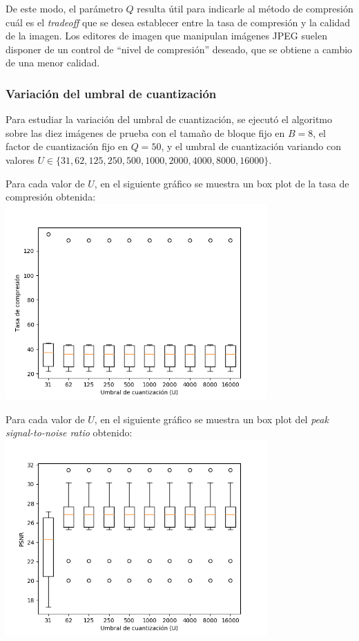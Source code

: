 \documentclass{article}
\newcommand{\set}[1]{\{#1\}}
\begin{document}
De este modo, el parámetro $Q$ resulta útil para indicarle al método
de compresión cuál es el {\em tradeoff} que se desea establecer entre
la tasa de compresión y la calidad de la imagen.
Los editores de imagen que manipulan imágenes JPEG suelen
disponer de un control de ``nivel de compresión'' deseado, que
se obtiene a cambio de una menor calidad.

\subsubsection{Variación del umbral de cuantización}

Para estudiar la variación del umbral de cuantización, se ejecutó el
algoritmo sobre las diez imágenes de prueba con el
tamaño de bloque fijo en $B = 8$,
el factor de cuantización fijo en $Q = 50$,
y el umbral de cuantización variando con valores
$U \in \set{31, 62, 125, 250, 500, 1000, 2000, 4000, 8000, 16000}$.

Para cada valor de $U$, en el siguiente gráfico se muestra un
box plot de la tasa de compresión obtenida:\\
\includegraphics[width=10cm]{../imgs/output/gray_plots/u_rate.png}

Para cada valor de $U$, en el siguiente gráfico se muestra un
box plot del {\em peak signal-to-noise ratio} obtenido:\\
\includegraphics[width=10cm]{../imgs/output/gray_plots/u_psnr.png}
\end{document}
